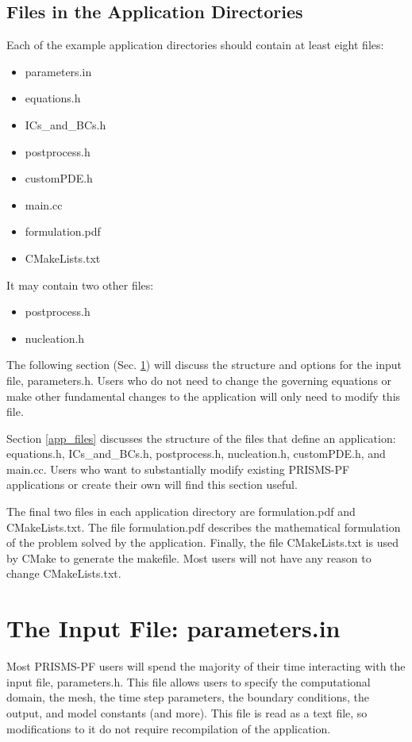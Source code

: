\documentclass[10pt]{article} %
\begin{document}
\subsection{Files in the Application Directories}
Each of the example application directories should contain at least eight files:
\begin{itemize}
\item parameters.in
\item equations.h
\item ICs\_and\_BCs.h
\item postprocess.h
\item customPDE.h
\item main.cc
\item formulation.pdf
\item CMakeLists.txt
\end{itemize}

It may contain two other files:
\begin{itemize}
\item postprocess.h
\item nucleation.h
\end{itemize}

The following section (Sec. \ref{parameters}) will discuss the structure and options for the input file, parameters.h. Users who do not need to change the governing equations or make other fundamental changes to the application will only need to modify this file.

Section \ref{app_files} discusses the structure of the files that define an application: equations.h, ICs\_and\_BCs.h, postprocess.h, nucleation.h, customPDE.h, and main.cc. Users who want to substantially modify existing PRISMS-PF applications or create their own will find this section useful.

The final two files in each application directory are formulation.pdf and CMakeLists.txt. The file formulation.pdf describes the mathematical formulation of the problem solved by the application. Finally, the file CMakeLists.txt is used by CMake to generate the makefile. Most users will not have any reason to change CMakeLists.txt.

\section{The Input File: parameters.in} \label{parameters}
Most PRISMS-PF users will spend the majority of their time interacting with the input file, parameters.h. This file allows users to specify the computational domain, the mesh, the time step parameters, the boundary conditions, the output, and model constants (and more). This file is read as a text file, so modifications to it do not require recompilation of the application.
\end{document}
